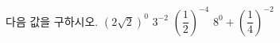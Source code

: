 다음 값을 구하시오.
 $(2\sqrt{2})^{0}$
 $3^{-2}$
 $\left(\dfrac{1}{2}\right)^{-4}$
 $8^{0}+\left(\dfrac{1}{4}\right)^{-2}$
